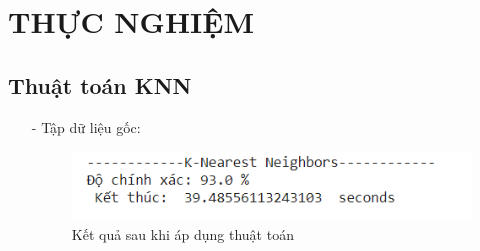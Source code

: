 \documentclass{report}
\begin{document}
\fontsize{16}{10}\selectfont
\chapter{THỰC NGHIỆM}
\fontsize{14}{10}\selectfont
\section{Thuật toán KNN}
     \fontsize{13}{14}\selectfont
     \begin{enumerate}
    \item [- ]	Tập dữ liệu gốc:
    \begin{center}
        \begin{figure}[htp]
    	\begin{center}
    		\includegraphics[scale =1.5]{images/knn_o.PNG}
    	\end{center}
    		\caption{Kết quả sau khi áp dụng thuật toán}
    \end{figure}
        \end{center}
\pagebreak
       \begin{center}
        \begin{figure}[htp]
    	\begin{center}

\end{center}
\end{figure}
\end{center}
\end{enumerate}
\end{document}
